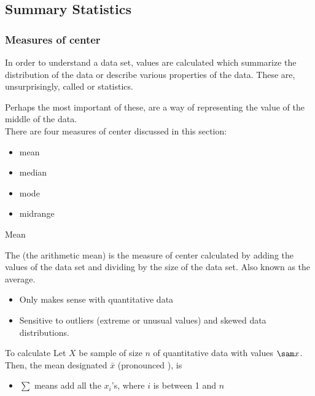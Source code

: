 \documentclass[xcolor=table, aspectratio=169, bigger]{beamer}
\begin{document}
% 
%
\subsection{Summary Statistics}

\begin{frame}
\frametitle{Measures of center}
\begin{block}{}
In order to understand a data set, values are calculated which summarize the distribution of the data or describe various properties of the data. These are, unsurprisingly, called  or  statistics.
\end{block}
\pause
\begin{block}{}
Perhaps the most important of these,  are a way of  representing the value of the middle of the data.\\
\medskip
There are four measures of center discussed in this section:
\begin{itemize}
\item mean
\item median
\item mode
\item midrange
\end{itemize} 
\end{block}
\end{frame}

\begin{frame}{Mean}
\begin{block}{}
The  (the arithmetic mean) is the measure of center calculated by adding the values of the data set and dividing by the size of the data set. Also known as the average.
\begin{itemize}
\item Only makes sense with quantitative data
\item Sensitive to outliers (extreme or unusual values) and skewed data distributions.
\end{itemize}
\end{block}

\pause
\begin{block}{To calculate}
Let $X$ be sample of size $n$ of quantitative data with values $\sam x$. Then, the mean designated $\bar x$ (pronounced ), is\\ \smallskip
{}
\begin{itemize}
\item $\sum$ means add all the $x_i$'s, where $i$ is between 1 and $n$
\end{itemize}
\end{block}
\end{frame}
\end{document}

